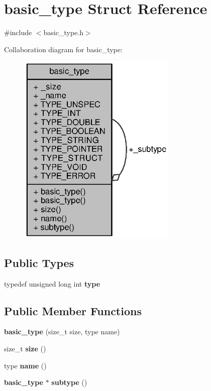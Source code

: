 \section{basic\+\_\+type Struct Reference}
\label{structbasic__type}


{\ttfamily \#include $<$basic\+\_\+type.\+h$>$}



Collaboration diagram for basic\+\_\+type\+:
\nopagebreak
\begin{figure}[H]
\begin{center}
\leavevmode
\includegraphics[width=215pt]{structbasic__type__coll__graph}
\end{center}
\end{figure}
\subsection*{Public Types}
\begin{DoxyCompactItemize}
\item 
typedef unsigned long int {\bfseries type}\label{structbasic__type_a7c0a7a590da8a3705a88d5e207e4b9ad}

\end{DoxyCompactItemize}
\subsection*{Public Member Functions}
\begin{DoxyCompactItemize}
\item 
{\bfseries basic\+\_\+type} (size\+\_\+t size, type name)\label{structbasic__type_a700988000343593c00601ec255b04d0b}

\item 
size\+\_\+t {\bfseries size} ()\label{structbasic__type_a4f76b416ac41dde6d7a9f51d7e909891}

\item 
type {\bfseries name} ()\label{structbasic__type_aaf747bec5153a84f07097482a77eae29}

\item 
{\bf basic\+\_\+type} $\ast$ {\bfseries subtype} ()\label{structbasic__type_ac3c708c8bbd2274461227daee6b50a6a}

\end{DoxyCompactItemize}
